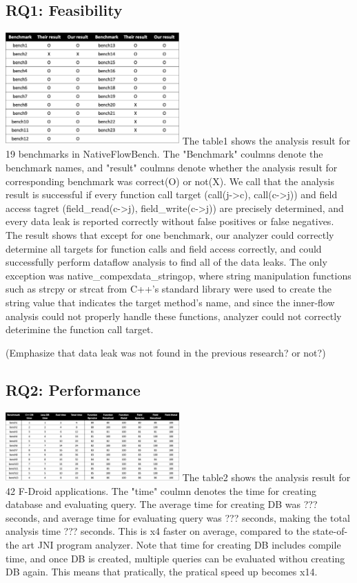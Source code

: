 \subsection{RQ1: Feasibility}
\includegraphics[width=0.5\textwidth]{img/table1}
The table1 shows the analysis result for 19 benchmarks in NativeFlowBench.  The
"Benchmark" coulmns denote the benchmark names, and "result" coulmns denote
whether the analysis result for corresponding benchmark was correct(O) or
not(X). We call that the analysis result is successful if every function call
target (call(j->c), call(c->j)) and field access tagret (field\_read(c->j),
field\_write(c->j)) are precisely determined, and every data leak is reported
correctly without false positives or false negatives.  The result shows that
except for one benchmark, our analyzer could correctly determine all targets
for function calls and field access correctly, and could successfully perform
dataflow analysis to find all of the data leaks. The only exception was
native\_compexdata\_stringop, where string manipulation functions such as
strcpy or strcat from C++'s standard library were used to create the string
value that indicates the target method's name, and since the inner-flow
analysis could not properly handle these functions, analyzer could not
correctly deterimine the function call target.

(Emphasize that data leak was not found in the previous research? or not?)

\subsection{RQ2: Performance}
\includegraphics[width=0.5\textwidth]{img/table2}
The table2 shows the analysis result for 42 F-Droid applications. The "time"
coulmn denotes the time for creating database and evaluating query. The average
time for creating DB was ??? seconds, and average time for evaluating query was
??? seconds, making the total analysis time ??? seconds. This is x4 faster on
average, compared to the state-of-the art JNI program analyzer.  Note that time
for creating DB includes compile time, and once DB is created, multiple queries
can be evaluated withou creating DB again. This means that pratically, the
pratical speed up becomes x14.

